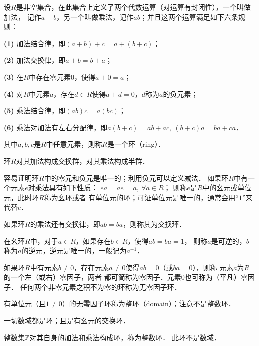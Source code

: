 \begin{definition}\label{chtop:def_ring}
    设$R$是非空集合，在此集合上定义了两个代数运算（对运算有封闭性），一个叫做{\kaishu 加法}，
    记作$a+b$，另一个叫做{\kaishu 乘法}，记作$ab$；并且这两个运算满足如下六条规则：
    
    {\bfseries (1)} 加法结合律，即$(a+b)+c=a+(b+c)$；
    
    {\bfseries (2)} 加法交换律，即$a+b=b+a$；
    
    {\bfseries (3)} 在$R$中存在零元素$0$，使得$a+0=a$；
    
    {\bfseries (4)} 对$R$中元素$a$，存在$d\in R$使得$a+d=0$，$d$称为$a$的负元素；
    
    {\bfseries (5)} 乘法结合律，即$(ab)c=a(bc)$；
    
    {\bfseries (6)} 乘法对加法有左右分配律，即$a(b+c)=ab+ac,\ (b+c)a= ba + ca$．
    
    其中$a,b,c$是$R$中任意元素，则称$R$是一个{\heiti 环}（ring）．
\end{definition}

环$R$对其加法构成交换群，对其乘法构成半群．

容易证明环$R$中的零元和负元是唯一的；利用负元可以定义减法．
如果环$R$中有一个元素$e$对乘法具有如下性质：
$e a = a e  =a, \ \forall a \in R $；
则称$e$是$R$中的{\heiti 幺元}或单位元，此时环$R$称为{\heiti 幺环}或者
有单位元的环；可证单位元是唯一的，通常会用“$1$”来代替$e$．

如果环$R$的乘法还有交换律，即$ab=ba$，则称其为{\heiti 交换环}．

在幺环$R$中，对于$a\in R$，如果存在$b\in R$，使得$ab=ba =1$，
则称$a$是可逆的，$b$称为$a$的逆元，逆元是唯一的，一般记为$a^{-1}$．

如果环$R$中有元素$b\neq 0$，存在元素$a\neq 0$使得$ab=0$（或$ba=0$），则称
元素$a$为$R$的一个{\heiti 左}（或{\heiti 右}）{\heiti 零因子}，两者
都可简称为{\heiti 零因子}．元素0也可称为（平凡）零因子．
任何两个非零元素之积不为零的环称为{\heiti 无零因子环}．

有单位元（且$1\neq 0$）的无零因子环称为{\heiti 整环}（domain）；注意不是整数环．

\begin{example}
    一切数域都是环；且是有幺元的交换环．
\end{example}

\begin{example}
    整数集$\mathbb{Z}$对其自身的加法和乘法构成环，称为{\heiti 整数环}．
    此环不是数域．
\end{example}

